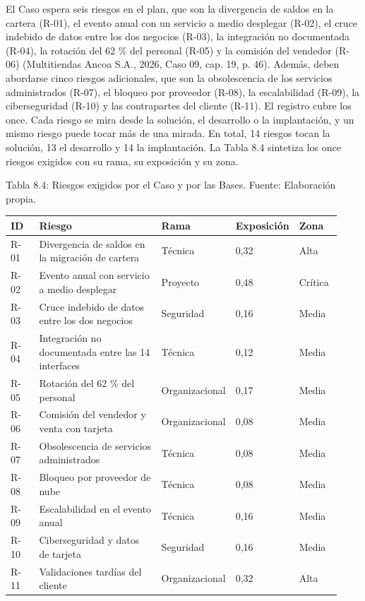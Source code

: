 \documentclass[11pt]{article}
\begin{document}
El Caso espera seis riesgos en el plan, que son la divergencia de saldos en la cartera (R-01), el evento anual con un servicio a medio desplegar (R-02), el cruce indebido de datos entre los dos negocios (R-03), la integración no documentada (R-04), la rotación del 62 \% del personal (R-05) y la comisión del vendedor (R-06) (Multitiendas Ancoa S.A., 2026, Caso 09, cap. 19, p. 46). Además, deben abordarse cinco riesgos adicionales, que son la obsolescencia de los servicios administrados (R-07), el bloqueo por proveedor (R-08), la escalabilidad (R-09), la ciberseguridad (R-10) y las contrapartes del cliente (R-11). El registro cubre los once. Cada riesgo se mira desde la solución, el desarrollo o la implantación, y un mismo riesgo puede tocar más de una mirada. En total, 14 riesgos tocan la solución, 13 el desarrollo y 14 la implantación. La Tabla 8.4 sintetiza los once riesgos exigidos con su rama, su exposición y su zona.

Tabla 8.4: Riesgos exigidos por el Caso y por las Bases. Fuente: Elaboración propia.

\begin{longtable}{p{0.097\linewidth}p{0.407\linewidth}p{0.155\linewidth}p{0.136\linewidth}p{0.136\linewidth}}
\toprule
\textbf{ID} & \textbf{Riesgo} & \textbf{Rama} & \textbf{Exposición} & \textbf{Zona} \\
\midrule
\endhead
\bottomrule
\endlastfoot
R-01 & Divergencia de saldos en la migración de cartera & Técnica & 0,32 & Alta \\
R-02 & Evento anual con servicio a medio desplegar & Proyecto & 0,48 & Crítica \\
R-03 & Cruce indebido de datos entre los dos negocios & Seguridad & 0,16 & Media \\
R-04 & Integración no documentada entre las 14 interfaces & Técnica & 0,12 & Media \\
R-05 & Rotación del 62 \% del personal & Organizacional & 0,17 & Media \\
R-06 & Comisión del vendedor y venta con tarjeta & Organizacional & 0,08 & Media \\
R-07 & Obsolescencia de servicios administrados & Técnica & 0,08 & Media \\
R-08 & Bloqueo por proveedor de nube & Técnica & 0,08 & Media \\
R-09 & Escalabilidad en el evento anual & Técnica & 0,16 & Media \\
R-10 & Ciberseguridad y datos de tarjeta & Seguridad & 0,16 & Media \\
R-11 & Validaciones tardías del cliente & Organizacional & 0,32 & Alta \\
\end{longtable}
\end{document}

